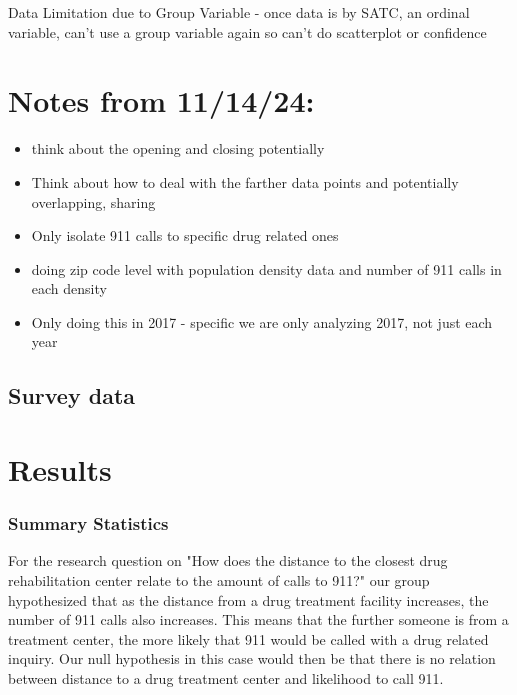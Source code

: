 \documentclass[12pt]{article}
\begin{document}
Data Limitation due to Group Variable - once data is by SATC, an ordinal variable, can't use a group variable again so can't do scatterplot or confidence

\section{Notes from 11/14/24:}
\begin{itemize}
    \item think about the opening and closing potentially
    \item Think about how to deal with the farther data points and potentially overlapping, sharing
    \item Only isolate 911 calls to specific drug related ones 
    \item doing zip code level with population density data and number of 911 calls in each density
    \item Only doing this in 2017 - specific we are only analyzing 2017, not just each year
    \end{itemize}
\subsection{Survey data}

\section{Results}
\label{sec:result}
\subsubsection{Summary Statistics}


For the research question on "How does the distance to the closest drug rehabilitation center relate to the amount of calls to 911?" our group hypothesized that as the distance from a drug treatment facility increases, the number of 911 calls also increases. This means that the further someone is from a treatment center, the more  likely that 911 would be called with a drug related inquiry. Our null hypothesis in this case would then be that there is no relation between distance to a drug treatment center and likelihood to call 911. 
\end{document}
